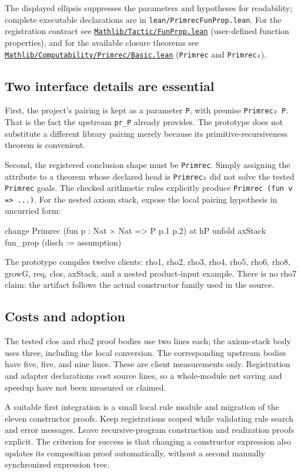 \documentclass[11pt,letterpaper]{article}
\newcommand{\code}[1]{\nolinkurl{#1}}
\newcommand{\mathsrc}[2]{\href{https://github.com/leanprover-community/mathlib4/blob/81a5d257c8e410db227a6665ed08f64fea08e997/Mathlib/#1.lean}{\nolinkurl{Mathlib/#1.lean}} (#2)}
\begin{document}
The displayed ellipsis suppresses the parameters and hypotheses for readability; complete executable declarations are in \code{lean/PrimrecFunProp.lean}. For the registration contract see \mathsrc{Tactic/FunProp}{user-defined function properties}, and for the available closure theorems see \mathsrc{Computability/Primrec/Basic}{\code{Primrec} and \code{Primrec₂}}.

\subsection{Two interface details are essential}

First, the project's pairing is kept as a parameter \code{P}, with premise \code{Primrec₂ P}. That is the fact the upstream \code{pr_P} already provides. The prototype does not substitute a different library pairing merely because its primitive-recursiveness theorem is convenient.

Second, the registered conclusion shape must be \code{Primrec}. Simply assigning the attribute to a theorem whose declared head is \code{Primrec₂} did not solve the tested \code{Primrec} goals. The checked arithmetic rules explicitly produce \code{Primrec (fun v => ...)}. For the nested axiom stack, expose the local pairing hypothesis in uncurried form:

\begin{Lean}
change Primrec (fun p : Nat × Nat => P p.1 p.2) at hP
unfold axStack
fun_prop (disch := assumption)
\end{Lean}

The prototype compiles twelve clients: rho1, rho2, rho3, rho4, rho5, rho6, rho8, growG, req, clos, axStack, and a nested product-input example. There is no rho7 claim: the artifact follows the actual constructor family used in the source.

\subsection{Costs and adoption}

The tested clos and rho2 proof bodies use two lines each; the axiom-stack body uses three, including the local conversion. The corresponding upstream bodies have five, five, and nine lines. These are client measurements only. Registration and adapter declarations cost source lines, so a whole-module net saving and speedup have not been measured or claimed.

A suitable first integration is a small local rule module and migration of the eleven constructor proofs. Keep registrations scoped while validating rule search and error messages. Leave recursive-program construction and realization proofs explicit. The criterion for success is that changing a constructor expression also updates its composition proof automatically, without a second manually synchronized expression tree.
\end{document}
